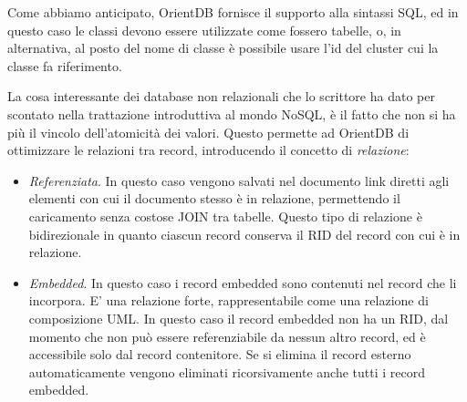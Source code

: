 Come abbiamo anticipato, OrientDB fornisce il supporto alla sintassi SQL, ed in questo caso le classi devono essere utilizzate come fossero tabelle, o, in alternativa, al posto del nome di classe è possibile usare l'id del cluster cui la classe fa riferimento.

La cosa interessante dei database non relazionali che lo scrittore ha dato per scontato nella trattazione introduttiva al mondo NoSQL, è il fatto che non si ha più il vincolo dell'atomicità dei valori. Questo permette ad OrientDB di ottimizzare le relazioni tra record, introducendo il concetto di \emph{relazione}:
\begin{itemize}
\item \emph{Referenziata}. In questo caso vengono salvati nel documento link diretti agli elementi con cui il documento stesso è in relazione, permettendo il caricamento senza costose JOIN tra tabelle. Questo tipo di relazione è bidirezionale in quanto ciascun record conserva il RID del record con cui è in relazione.
\item \emph{Embedded}. In questo caso i record embedded sono contenuti nel record che li incorpora. E' una relazione forte, rappresentabile come una relazione di composizione UML. In questo caso il record embedded non ha un RID, dal momento che non può essere referenziabile da nessun altro record, ed è accessibile solo dal record contenitore. Se si elimina il record esterno automaticamente vengono eliminati ricorsivamente anche tutti i record embedded.
\end{itemize}

\endinput


